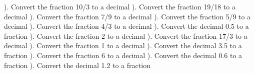 \documentclass{article}%
\begin{document}
\newline%
\newline%
). Convert the fraction 10/3 to a decimal%
\newline%
\newline%
). Convert the fraction 19/18 to a decimal%
\newline%
\newline%
). Convert the fraction 7/9 to a decimal%
\newline%
\newline%
). Convert the fraction 5/9 to a decimal%
\newline%
\newline%
). Convert the fraction 4/3 to a decimal%
\newline%
\newline%
). Convert the decimal 0.5 to a fraction%
\newline%
\newline%
). Convert the fraction 2 to a decimal%
\newline%
\newline%
). Convert the fraction 17/3 to a decimal%
\newline%
\newline%
). Convert the fraction 1 to a decimal%
\newline%
\newline%
). Convert the decimal 3.5 to a fraction%
\newline%
\newline%
). Convert the fraction 6 to a decimal%
\newline%
\newline%
). Convert the decimal 0.6 to a fraction%
\newline%
\newline%
). Convert the decimal 1.2 to a fraction%
\newline%
\newline%
\end{document}

